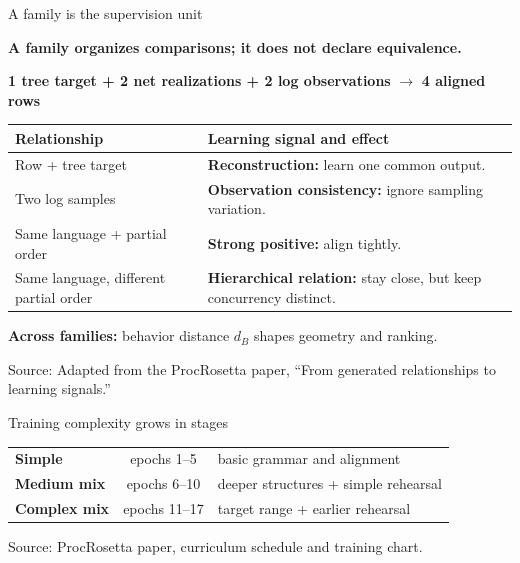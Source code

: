 \documentclass[aspectratio=169,12pt]{beamer}
\newcommand{\paperfigure}[1]{%
  \begingroup
  \newenvironment{figure*}[1][]{\par\centering}{\par}
  \renewcommand{\caption}[1]{}
  \renewcommand{\label}[1]{}
  
  \endgroup
}
\newcommand{\source}[1]{\vfill{\tiny\color{prgray}Source: #1\par}}
\newcommand{\keyline}[1]{%
  \begin{center}
  \colorbox{prlightteal}{\parbox{0.91\textwidth}{\centering\bfseries\color{prnavy}#1}}
  \end{center}
}
\begin{document}
\begin{frame}[t]{A family is the supervision unit}
  \vspace{0mm}
  \keyline{A family organizes comparisons; it does not declare equivalence.}
  \vspace{2mm}
  \centering
  \large
  \textbf{1 tree target + 2 net realizations + 2 log observations}
  $\longrightarrow$ \textbf{4 aligned rows}
  \par\vspace{2mm}

  \scriptsize
  \renewcommand{\arraystretch}{1.08}
  \setlength{\tabcolsep}{4pt}
  \begin{tabular}{@{}>{\raggedright\arraybackslash}p{}
                      >{\raggedright\arraybackslash}p{}@{}}
    \toprule
    Relationship & Learning signal and effect \\
    \midrule
    Row + tree target & \textbf{Reconstruction:} learn one common output. \\
    Two log samples & \textbf{Observation consistency:} ignore sampling variation. \\
    Same language + partial order & \textbf{Strong positive:} align tightly. \\
    Same language, different partial order & \textbf{Hierarchical relation:} stay close, but keep concurrency distinct. \\
    \bottomrule
  \end{tabular}
  \par\vspace{2mm}
  \small\textbf{Across families:} behavior distance $d_B$ shapes geometry and ranking.
  \source{Adapted from the ProcRosetta paper, ``From generated relationships to learning signals.''}
\end{frame}

\begin{frame}[t]{Training complexity grows in stages}
  \vspace{-1mm}
  \paperfigure{figures/training}
  \vspace{-1mm}
  \centering
  \small
  \begin{tabular}{@{}>{\bfseries}lcl@{}}
    \textcolor{prgold}{Simple} & epochs 1--5 & basic grammar and alignment \\
    \textcolor{prteal}{Medium mix} & epochs 6--10 & deeper structures + simple rehearsal \\
    \textcolor{prred}{Complex mix} & epochs 11--17 & target range + earlier rehearsal \\
  \end{tabular}
  \par\vspace{0mm}
  \source{ProcRosetta paper, curriculum schedule and training chart.}
\end{frame}
\end{document}
